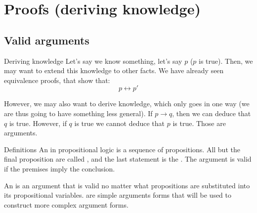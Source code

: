 \documentclass{article}
\begin{document}
\section{Proofs (deriving knowledge)}
\subsection{Valid arguments}

\begin{parag}{Deriving knowledge}
    Let's say we know something, let's say $p$ ($p$ is true). Then, we may want to extend this knowledge to other facts. We have already seen equivalence proofs, that show that: 
    \[p \leftrightarrow p'\]
    
    However, we may also want to derive knowledge, which only goes in one way (we are thus going to have something less general). If $p \to q$, then we can deduce that $q$ is true. However, if $q$ is true we cannot deduce that $p$ is true. Those are arguments.
\end{parag}

\begin{parag}{Definitions}
    An  in propositional logic is a sequence of propositions. All but the final proposition are called , and the last statement is the . The argument is valid if the premises imply the conclusion.

    An  is an argument that is valid no matter what propositions are substituted into its propositional variables.  are simple arguments forms that will be used to construct more complex argument forms.
\end{parag}
\end{document}

